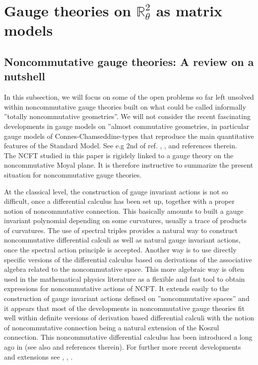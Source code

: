 \documentclass[a4paper]{jpconf}
\numberwithin{equation}{section}
\theoremstyle{nonumberplain}
\begin{document}

\section{\texorpdfstring{Gauge theories on $\mathbb{R}^2_\theta$ as matrix models}{Moyal 2-d}}\label{subsection22}


\subsection{Noncommutative gauge theories: A review on a nutshell}\label{section-review}

In this subsection, we will focus on some of the open problems so far left unsolved within noncommutative gauge theories built on what could be called informally  ''totally noncommutative geometries''. We will not consider the recent fascinating developments in gauge models on ''almost commutative geometries, in particular gauge models of Connes-Chamseddine-types that reproduce the main quantitative features of the Standard Model. See e.g 2nd of ref. \cite{Connes1}, \cite{ccs1}, \cite{ccs2}and references therein. \\
The NCFT studied in this paper is rigidely linked to a gauge theory on the noncommutative Moyal plane. It is therefore instructive to summarize the present situation for noncommutative gauge theories.\par
At the classical level, the construction of gauge invariant actions is not so difficult, once a differential calculus has been set up, together with a proper notion of noncommutative connection. This basically amounts to built a gauge invariant polynomial depending on some curvatures, usually a trace of products of curvatures. The use of spectral triples provides a natural way to construct noncommutative differential calculi as well as natural gauge invariant actions, once the spectral action principle is accepted. Another way is to use directly specific versions of the differential calculus based on derivations of the associative algebra related to the noncommutative space. This more algebraic way is often used in the mathematical physics literature as a flexible and fast tool to obtain expressions for noncommutative actions of NCFT. It extends easily to the construction of gauge invariant actions defined on ''noncommutative spaces'' and it appears that most of the developments in noncommutative gauge 
theories fit well within definite versions of derivation based differential calculi with the notion of noncommutative connection being a natural extension of the Koszul connection. This noncommutative differential calculus has been introduced a long ago in \cite{mdv88} (see also \cite{mdv99} and references therein). For further more recent developments and extensions see \cite{WAL1}, \cite{WAL2}, \cite{WAL3}.\par
\end{document}
